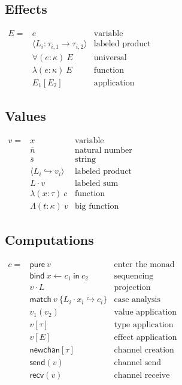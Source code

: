 \documentclass[12pt]{article}
\begin{document}
\subsection{Effects}

$\begin{array}{rll}
E =
  & e                              & \text{variable} \\
  & \langle L_i : \tau_{i,1}
    \rightarrow \tau_{i,2} \rangle & \text{labeled product} \\
  & \forall (e : \kappa) \ E       & \text{universal} \\
  & \lambda (e : \kappa) \ E       & \text{function} \\
  & E_1[E_2]                       & \text{application}
\end{array}$

\subsection{Values}

$\begin{array}{rll}
v =
  & x                           & \text{variable} \\
  & \overline{n}                & \text{natural number} \\
  & \overline{s}                & \text{string} \\
  & \langle L_i
    \hookrightarrow v_i \rangle & \text{labeled product} \\
  & L \cdot v                   & \text{labeled sum} \\
  & \lambda (x : \tau) \ c      & \text{function} \\
  & \Lambda (t : \kappa) \ v    & \text{big function}
\end{array}$

\subsection{Computations}

$\begin{array}{rll}
c =
  & \textsf{pure} \ v      & \text{enter the monad} \\
  & \textsf{bind} \
    x \leftarrow c_1 \
  \textsf{in} \ c_2      & \text{sequencing} \\
  & v \cdot L              & \text{projection} \\
  & \textsf{match} \ v \
    \{ L_i \cdot x_i
    \hookrightarrow c_i \} & \text{case analysis} \\
  & v_1(v_2)               & \text{value application} \\
  & v[\tau]                & \text{type application} \\
  & v[E]                   & \text{effect application} \\
  & \textsf{newchan}[\tau] & \text{channel creation} \\
  & \textsf{send}(v)       & \text{channel send} \\
  & \textsf{recv}(v)       & \text{channel receive}
\end{array}$
\end{document}
